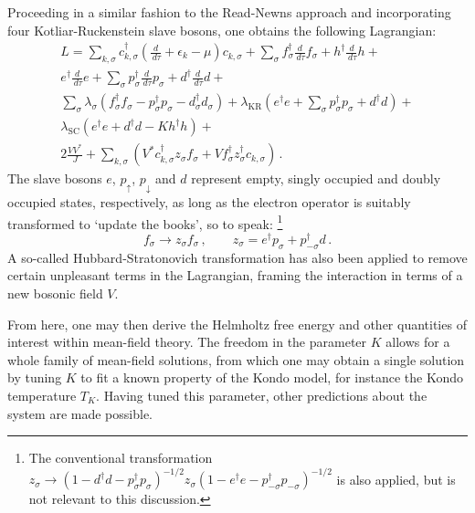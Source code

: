 \documentclass[12pt]{article}
\begin{document}
Proceeding in a similar fashion to the Read-Newns approach and incorporating four Kotliar-Ruckenstein \cite{KotliarRuckenstein} slave bosons, one obtains the following Lagrangian: \begin{eqnarray} L = \sum_{k,\sigma} c^{\dagger}_{k,\sigma} \left( \frac{d}{\,d\tau} + \epsilon_k - \mu \right) c^{}_{k,\sigma} + \sum_{\sigma} f^{\dagger}_{\sigma} \frac{d}{\,d\tau} f^{}_{\sigma} + h^{\dagger} \frac{d}{\,d\tau}h + \\
e^{\dagger} \frac{d}{\,d\tau} e  + \sum_{\sigma} p^{\dagger}_{\sigma} \frac{d}{\,d\tau} p^{}_{\sigma} + d^{\dagger} \frac{d}{\,d\tau} d + \\
\sum_{\sigma} \lambda^{}_{\sigma} (f^{\dagger}_{\sigma} f^{}_{\sigma} - p^{\dagger}_{\sigma} p^{}_{\sigma} - d^{\dagger}_{\sigma} d^{}_\sigma ) + \lambda_{\text{KR}} \left( e^{\dagger} e + \sum_{\sigma} p^{\dagger}_{\sigma} p^{}_{\sigma} + d^{\dagger} d \right) + \\
\lambda_{\text{SC}} ( e^{\dagger} e + d^{\dagger} d - K h^{\dagger} h) + \\
2 \frac{V V^{\ast}}{J} + \sum_{k,\sigma} \left( V^{\ast} c^{\dagger}_{k,\sigma} z^{}_{\sigma} f^{}_{\sigma} + V f^{\dagger}_{\sigma} z^{\dagger}_{\sigma} c^{}_{k,\sigma} \right) \,. \end{eqnarray} The slave bosons $ e $, $ p_{\uparrow} $, $ p_{\downarrow} $ and $ d $ represent empty, singly occupied and doubly occupied states, respectively, as long as the electron operator is suitably transformed to `update the books', so to speak: \footnote{The conventional transformation $ z^{}_{\sigma} \rightarrow (1 - d^{\dagger} d - p^{\dagger}_{\sigma} p^{}_{\sigma})^{- 1 / 2} z^{}_{\sigma} (1 - e^{\dagger} e - p^{\dagger}_{- \sigma} p^{}_{- \sigma})^{- 1 / 2} $ is also applied, but is not relevant to this discussion.} \begin{equation} f^{}_{\sigma} \rightarrow z^{}_{\sigma} f^{}_{\sigma}\,, \qquad z_{\sigma} = e^{\dagger} p^{}_{\sigma} + p^{\dagger}_{-\sigma} d \,. \end{equation} A so-called Hubbard-Stratonovich transformation has also been applied to remove certain unpleasant terms in the Lagrangian, framing the interaction in terms of a new bosonic field $ V $.

From here, one may then derive the Helmholtz free energy and other quantities of interest within mean-field theory. The freedom in the parameter $ K $ allows for a whole family of mean-field solutions, from which one may obtain a single solution by tuning $ K $ to fit a known property of the Kondo model, for instance the Kondo temperature $ T_K $. Having tuned this parameter, other predictions about the system are made possible.
\end{document}
